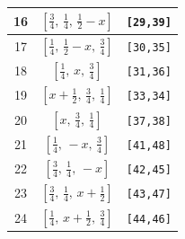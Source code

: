 \documentclass[fleqn,8pt]{jsarticle}
\begin{document}
\begin{longtable}{ccc}
16 & $\left[ \frac{3}{4},\, \frac{1}{4},\, \frac{1}{2} - x \right]$ & {\tt [29,39]} \\ \hline
17 & $\left[ \frac{1}{4},\, \frac{1}{2} - x,\, \frac{3}{4} \right]$ & {\tt [30,35]} \\ \hline
18 & $\left[ \frac{1}{4},\, x,\, \frac{3}{4} \right]$ & {\tt [31,36]} \\ \hline
19 & $\left[ x + \frac{1}{2},\, \frac{3}{4},\, \frac{1}{4} \right]$ & {\tt [33,34]} \\ \hline
20 & $\left[ x,\, \frac{3}{4},\, \frac{1}{4} \right]$ & {\tt [37,38]} \\ \hline
21 & $\left[ \frac{1}{4},\, - x,\, \frac{3}{4} \right]$ & {\tt [41,48]} \\ \hline
22 & $\left[ \frac{3}{4},\, \frac{1}{4},\, - x \right]$ & {\tt [42,45]} \\ \hline
23 & $\left[ \frac{3}{4},\, \frac{1}{4},\, x + \frac{1}{2} \right]$ & {\tt [43,47]} \\ \hline
24 & $\left[ \frac{1}{4},\, x + \frac{1}{2},\, \frac{3}{4} \right]$ & {\tt [44,46]} \\
\end{longtable}
\renewcommand{\arraystretch}{1.2}
\end{document}
